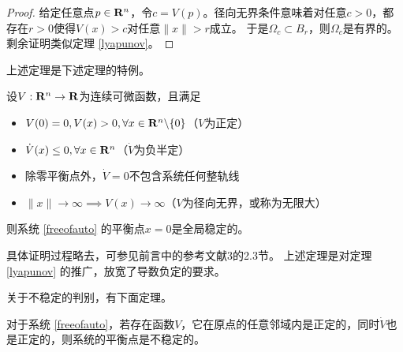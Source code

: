 \begin{proof}
  给定任意点$p\in\mathbf{R}{}^n$，令$c=V(p)$。径向无界条件意味着对任意$c>0$，都存在$r>0$使得$V(x)>c$对任意$\|x\|>r$成立。
  于是$\Omega_c\subset B_r$，则$\Omega_c$是有界的。剩余证明类似定理 \ref{lyapunov}。
\end{proof}
上述定理是下述定理的特例。
\begin{theorem}
  设$V:\mathbf{R}{}^n\to\mathbf{R}$为连续可微函数，且满足
    \begin{itemize}[leftmargin=1em]
      \item $V(0)=0,V(x)>0,\forall x\in \mathbf{R}{}^n\backslash\{0\}$（$V$为正定）
      \item $\dot{V}(x)\le 0,\forall x\in \mathbf{R}{}^n$（$\dot{V}$为负半定）
      \item 除零平衡点外，$\dot{V}=0$不包含系统任何整轨线
      \item $\|x\|\to\infty\implies V(x)\to \infty$（$V$为径向无界，或称为无限大）
    \end{itemize}
  则系统 \eqref{freeofauto} 的平衡点$x=0$是全局稳定的。
\end{theorem}
具体证明过程略去，可参见前言中的参考文献3的2.3节。
上述定理是对定理 \ref{lyapunov} 的推广，放宽了导数负定的要求。

关于不稳定的判别，有下面定理。
\begin{theorem}[不稳定性判别定理]\label{unstable}
  对于系统 \eqref{freeofauto}，若存在函数$V$，它在原点的任意邻域内是正定的，同时$\dot{V}$也是正定的，则系统的平衡点是不稳定的。
\end{theorem}